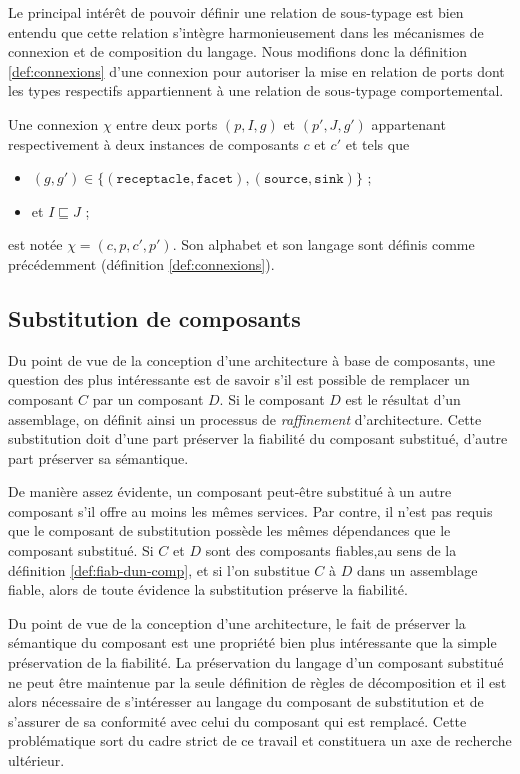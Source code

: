 Le principal int\'er\^et de pouvoir d\'efinir une relation de
sous-typage est bien entendu que cette relation s'int\`egre
harmonieusement dans les m\'ecanismes de connexion et de composition
du langage. 
Nous modifions donc la d\'efinition \ref{def:connexions} d'une connexion pour
autoriser la mise en relation de ports dont les types
respectifs appartiennent \`a une relation de sous-typage
comportemental. 

\begin{definition}[Connexion]
Une connexion $\chi$ entre deux ports $(p,I,g)$ et $(p',J,g')$ appartenant respectivement
\`a deux instances de composants $c$ et $c'$ et tels que 
\begin{itemize}
  \item $(g,g') \in \{(\mathtt{receptacle},\mathtt{facet}),(\mathtt{source},\mathtt{sink})\}$
    ;
  \item et $I\sqsubseteq J$ ;
\end{itemize}
est not\'ee $\chi = (c,p,c',p')$. Son alphabet et son langage sont
d\'efinis comme pr\'ec\'edemment (d\'efinition  \ref{def:connexions}).
\end{definition}

\subsection{Substitution de composants}

Du point de vue de la conception d'une architecture \`a base de
composants, une question des plus int\'eressante est de savoir s'il
est possible de remplacer un composant $C$ par un composant $D$. Si le
composant $D$ est le r\'esultat d'un assemblage, on d\'efinit ainsi
un processus de \emph{raffinement} d'architecture. Cette substitution
doit d'une part pr\'eserver la fiabilit\'e du composant
substitu\'e, d'autre part pr\'eserver sa s\'emantique. 

De mani\`ere assez \'evidente, un
composant peut-\^etre substitu\'e \`a un autre composant s'il offre
au moins les m\^emes services. Par contre, il n'est pas requis que le
composant de substitution poss\`ede les m\^emes d\'ependances que le
composant substitu\'e. Si $C$ et $D$ sont des composants fiables,au sens  de
la d\'efinition \ref{def:fiab-dun-comp},
et si l'on substitue $C$ \`a $D$ dans un assemblage fiable,  alors de toute \'evidence
la substitution pr\'eserve la fiabilit\'e. 

Du point de vue de la conception d'une architecture, le  fait de
pr\'eserver la s\'emantique du composant est une propri\'et\'e bien plus
int\'eressante que la simple pr\'eservation de la fiabilit\'e. La
pr\'eservation du langage d'un composant substitu\'e ne peut \^etre
maintenue par la seule d\'efinition de r\`egles de d\'ecomposition
et il est alors  n\'ecessaire de s'int\'eresser au langage du composant de
substitution 
et de s'assurer de sa \og conformit\'e \fg{} avec celui du composant
qui est remplac\'e. 
Cette probl\'ematique sort du cadre strict de ce travail et
constituera un axe de recherche ult\'erieur.

